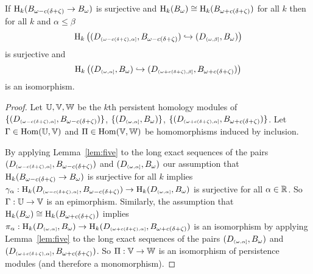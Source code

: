 %
%
%

\begin{lemma}\label{lem:pt_interleaving}
  If $\mathrm{H}_k(B_{\omega - c(\delta+\zeta)}\to B_{\omega})$ is surjective and $\mathrm{H}_k(B_{\omega})\cong \mathrm{H}_k(B_{\omega + c(\delta+\zeta)})$ for all $k$ then for all $k$ and $\alpha\leq\beta$
  \[\mathrm{H}_k\left((D_{\scriptscriptstyle (\omega-c(\delta+\zeta),\alpha]},B_{\omega-c(\delta+\zeta)})\hookrightarrow (D_{\scriptscriptstyle (\omega,\beta]},B_{\omega})\right)\]
  is surjective and
  \[ \mathrm{H}_k\left( (D_{\scriptscriptstyle (\omega,\alpha]},B_\omega)\hookrightarrow (D_{\scriptscriptstyle (\omega+c(\delta+\zeta),\beta]},B_{\omega+c(\delta+\zeta)}) \right)\]
  is an isomorphism.
\end{lemma}
\begin{proof}
  Let $\mathbb{U}, \mathbb{V}, \mathbb{W}$ be the $k$th persistent homology modules of $\{(D_{\scriptscriptstyle (\omega-c(\delta+\zeta), \alpha]}, B_{\omega - c(\delta+\zeta)})\}$, $\{(D_{\scriptscriptstyle (\omega,\alpha]}, B_{\omega})\}$, $\{(D_{\scriptscriptstyle (\omega+c(\delta+\zeta),\alpha]}, B_{\omega + c(\delta+\zeta)})\}$.
  Let $\Gamma\in\mathrm{Hom}(\mathbb{U},\mathbb{V})$ and $\Pi\in\mathrm{Hom}(\mathbb{V},\mathbb{W})$ be homomorphisms induced by inclusion.

  By applying Lemma~\ref{lem:five} to the long exact sequences of the pairs $(D_{\scriptscriptstyle (\omega-c(\delta+\zeta),\alpha]},B_{\omega - c(\delta+\zeta)})$ and $(D_{\scriptscriptstyle (\omega,\alpha]},B_{\omega})$ our assumption that $\mathrm{H}_k(B_{\omega - c(\delta+\zeta)}\to B_{\omega})$ is surjective for all $k$ implies $\gamma_\alpha : \mathrm{H}_k(D_{\scriptscriptstyle (\omega-c(\delta+\zeta),\alpha]},B_{\omega - c(\delta+\zeta)})\to \mathrm{H}_k(D_{\scriptscriptstyle (\omega,\alpha]},B_{\omega})$ is surjective for all $\alpha\in\mathbb{R}$.
  So $\Gamma : \mathbb{U}\to \mathbb{V}$ is an epimorphism.
  Similarly, the assumption that $\mathrm{H}_k(B_{\omega})\cong \mathrm{H}_k(B_{\omega + c(\delta+\zeta)})$ implies $\pi_\alpha : \mathrm{H}_k(D_{\scriptscriptstyle (\omega,\alpha]},B_{\omega})\to \mathrm{H}_k(D_{\scriptscriptstyle (\omega+c(\delta+\zeta),\alpha]},B_{\omega + c(\delta+\zeta)})$ is an isomorphism by applying Lemma~\ref{lem:five} to the long exact sequences of the pairs $(D_{\scriptscriptstyle (\omega,\alpha]},B_{\omega})$ and $(D_{\scriptscriptstyle (\omega+c(\delta+\zeta),\alpha]},B_{\omega + c(\delta+\zeta)})$.
  So $\Pi : \mathbb{V}\to\mathbb{W}$ is an isomorphism of persistence modules (and therefore a monomorphism).



\end{proof}

